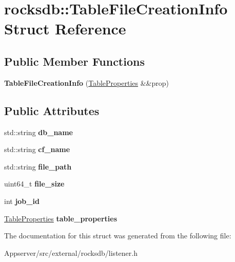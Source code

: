 \hypertarget{structrocksdb_1_1TableFileCreationInfo}{}\section{rocksdb\+:\+:Table\+File\+Creation\+Info Struct Reference}
\label{structrocksdb_1_1TableFileCreationInfo}
\subsection*{Public Member Functions}
\begin{DoxyCompactItemize}
\item 
{\bfseries Table\+File\+Creation\+Info} (\hyperlink{structrocksdb_1_1TableProperties}{Table\+Properties} \&\&prop)\hypertarget{structrocksdb_1_1TableFileCreationInfo_ad61fe0b00cd9531d396166d716244cba}{}\label{structrocksdb_1_1TableFileCreationInfo_ad61fe0b00cd9531d396166d716244cba}

\end{DoxyCompactItemize}
\subsection*{Public Attributes}
\begin{DoxyCompactItemize}
\item 
std\+::string {\bfseries db\+\_\+name}\hypertarget{structrocksdb_1_1TableFileCreationInfo_a486e38b09d03d435af0ea4a1f40e0413}{}\label{structrocksdb_1_1TableFileCreationInfo_a486e38b09d03d435af0ea4a1f40e0413}

\item 
std\+::string {\bfseries cf\+\_\+name}\hypertarget{structrocksdb_1_1TableFileCreationInfo_a270f25ac5b9a16498951727b4e566ed7}{}\label{structrocksdb_1_1TableFileCreationInfo_a270f25ac5b9a16498951727b4e566ed7}

\item 
std\+::string {\bfseries file\+\_\+path}\hypertarget{structrocksdb_1_1TableFileCreationInfo_a538966a04687f515a04e5929c577daf0}{}\label{structrocksdb_1_1TableFileCreationInfo_a538966a04687f515a04e5929c577daf0}

\item 
uint64\+\_\+t {\bfseries file\+\_\+size}\hypertarget{structrocksdb_1_1TableFileCreationInfo_aaf4218d60e494b222852b07766951af6}{}\label{structrocksdb_1_1TableFileCreationInfo_aaf4218d60e494b222852b07766951af6}

\item 
int {\bfseries job\+\_\+id}\hypertarget{structrocksdb_1_1TableFileCreationInfo_a3fdcf4ef4ec31618404c71b57de6687f}{}\label{structrocksdb_1_1TableFileCreationInfo_a3fdcf4ef4ec31618404c71b57de6687f}

\item 
\hyperlink{structrocksdb_1_1TableProperties}{Table\+Properties} {\bfseries table\+\_\+properties}\hypertarget{structrocksdb_1_1TableFileCreationInfo_ad7f4cd10c6c0524ad4252a942515af00}{}\label{structrocksdb_1_1TableFileCreationInfo_ad7f4cd10c6c0524ad4252a942515af00}

\end{DoxyCompactItemize}


The documentation for this struct was generated from the following file\+:\begin{DoxyCompactItemize}
\item 
Appserver/src/external/rocksdb/listener.\+h\end{DoxyCompactItemize}
